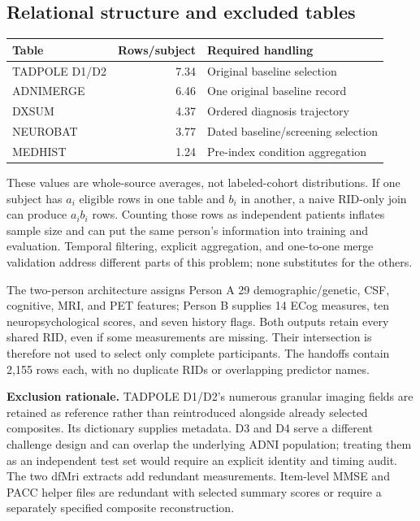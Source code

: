 \documentclass[11pt,a4paper]{article}
\begin{document}
\subsection{Relational structure and excluded tables}
\begin{center}\small
\begin{tabular}{p{.27\linewidth}rp{.46\linewidth}}\hline
Table & Rows/subject & Required handling\\\hline
TADPOLE D1/D2 & 7.34 & Original baseline selection\\
ADNIMERGE & 6.46 & One original baseline record\\
DXSUM & 4.37 & Ordered diagnosis trajectory\\
NEUROBAT & 3.77 & Dated baseline/screening selection\\
MEDHIST & 1.24 & Pre-index condition aggregation\\
\hline\end{tabular}\end{center}
These values are whole-source averages, not labeled-cohort distributions. If one subject has $a_i$ eligible rows in one table and $b_i$ in another, a naive RID-only join can produce $a_ib_i$ rows. Counting those rows as independent patients inflates sample size and can put the same person's information into training and evaluation. Temporal filtering, explicit aggregation, and one-to-one merge validation address different parts of this problem; none substitutes for the others.

The two-person architecture assigns Person A 29 demographic/genetic, CSF, cognitive, MRI, and PET features; Person B supplies 14 ECog measures, ten neuropsychological scores, and seven history flags. Both outputs retain every shared RID, even if some measurements are missing. Their intersection is therefore not used to select only complete participants. The handoffs contain 2,155 rows each, with no duplicate RIDs or overlapping predictor names.

\textbf{Exclusion rationale.} TADPOLE D1/D2's numerous granular imaging fields are retained as reference rather than reintroduced alongside already selected composites. Its dictionary supplies metadata. D3 and D4 serve a different challenge design and can overlap the underlying ADNI population; treating them as an independent test set would require an explicit identity and timing audit. The two dfMri extracts add redundant measurements. Item-level MMSE and PACC helper files are redundant with selected summary scores or require a separately specified composite reconstruction.
\end{document}
